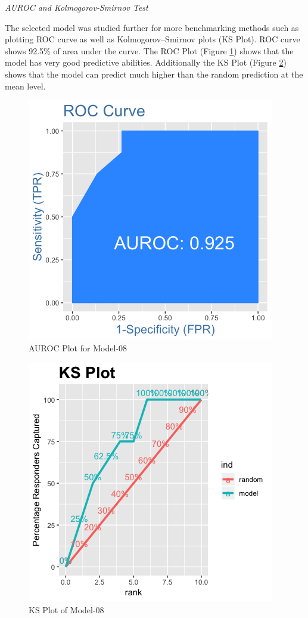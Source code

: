 \documentclass[11pt]{article}
\begin{document}
\newpage
{\it AUROC and Kolmogorov-Smirnov Test}

The selected model was studied further for more benchmarking methods such as plotting ROC curve as well as Kolmogorov–Smirnov plots (KS Plot). ROC curve shows 92.5\% of area under the curve. The ROC Plot (Figure \ref{fig:AUROC}) shows that the model has very good predictive abilities. Additionally the KS Plot (Figure \ref{fig:KSPlot}) shows that the model can predict much higher than the random prediction at the mean level. 

\begin{figure}[htbp]
\centering
\includegraphics[scale=0.7]{AUROC-08.png}
\caption{AUROC Plot for Model-08}
\label{fig:AUROC}
\end{figure}

\begin{figure}[htbp]
\centering
\includegraphics[scale=0.7]{KSPlot-08.png}
\caption{KS Plot of Model-08}
\label{fig:KSPlot}
\end{figure}
\end{document}
